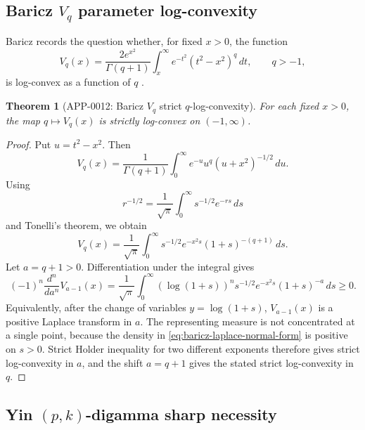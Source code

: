 \documentclass[11pt]{article}
\numberwithin{equation}{section}
\newtheorem{theorem}{Theorem}[section]
\theoremstyle{definition}
\theoremstyle{remark}
\newcommand{\1}{\mathbf 1}
\begin{document}
\subsection{Baricz \(V_q\) parameter log-convexity}

Baricz records the question whether, for fixed \(x>0\), the function
\begin{equation}
\label{eq:baricz-vq-definition}
V_q(x)=\frac{2e^{x^2}}{\Gamma(q+1)}
\int_x^\infty e^{-t^2}(t^2-x^2)^q\,dt,
\qquad q>-1,
\end{equation}
is log-convex as a function of \(q\) \cite{baricz-turan-thesis}.

\begin{theorem}[APP-0012: Baricz \(V_q\) strict \(q\)-log-convexity]
\label{thm:baricz-vq-strict-logconvexity}
For each fixed \(x>0\), the map \(q\mapsto V_q(x)\) is strictly log-convex on \((-1,\infty)\).
\end{theorem}

\begin{proof}
Put \(u=t^2-x^2\).  Then
\begin{equation}
\label{eq:baricz-u-normal-form}
V_q(x)=\frac1{\Gamma(q+1)}
\int_0^\infty e^{-u}u^q(u+x^2)^{-1/2}\,du.
\end{equation}
Using
\[
r^{-1/2}=\frac1{\sqrt\pi}\int_0^\infty s^{-1/2}e^{-rs}\,ds
\]
and Tonelli's theorem, we obtain
\begin{equation}
\label{eq:baricz-laplace-normal-form}
V_q(x)=\frac1{\sqrt\pi}\int_0^\infty
s^{-1/2}e^{-x^2s}(1+s)^{-(q+1)}\,ds.
\end{equation}
Let \(a=q+1>0\).  Differentiation under the integral gives
\begin{equation}
\label{eq:baricz-complete-monotonicity}
(-1)^n\frac{d^n}{da^n}V_{a-1}(x)
=\frac1{\sqrt\pi}\int_0^\infty
(\log(1+s))^n s^{-1/2}e^{-x^2s}(1+s)^{-a}\,ds\ge0.
\end{equation}
Equivalently, after the change of variables \(y=\log(1+s)\), \(V_{a-1}(x)\) is a positive Laplace transform in \(a\).  The representing measure is not concentrated at a single point, because the density in \eqref{eq:baricz-laplace-normal-form} is positive on \(s>0\).  Strict Holder inequality for two different exponents therefore gives strict log-convexity in \(a\), and the shift \(a=q+1\) gives the stated strict log-convexity in \(q\).
\end{proof}

\subsection{Yin \((p,k)\)-digamma sharp necessity}
\end{document}
